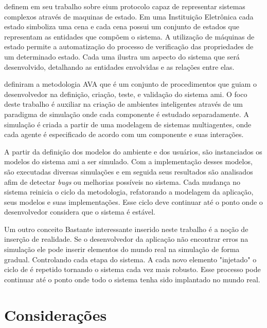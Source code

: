 
 definem  em seu trabalho sobre \acrfull{ei}um protocolo capaz de representar sistemas complexos através de maquinas de estado. Em uma Instituição Eletrônica cada estado simboliza uma cena e cada cena possui um conjunto de estados que representam as entidades que compõem o sistema. A utilização de máquinas de estado permite a automatização do processo de verificação das propriedades de um determinado estado. Cada uma ilustra um aspecto do sistema que será desenvolvido, detalhando as entidades envolvidas e as relações entre elas. 


 definiram a metodologia AVA que é um conjunto de procedimentos que guiam o desenvolvedor na definição, criação, teste, e validação do sistema \acrshort{ami}.  O foco deste trabalho é auxiliar na criação de ambientes inteligentes através de um paradigma de simulação onde cada componente é estudado separadamente. A simulação é criada a partir de uma modelagem de sistemas multiagentes, onde cada agente é especificado de acordo com um componente e suas interações.

A partir da definição dos modelos do ambiente e dos usuários, são instanciados os modelos do sistema \acrshort{ami} a ser simulado. Com a implementação desses modelos, são executadas diversas simulações e em seguida seus resultados são analisados afim de detectar \textit{bugs} ou melhorias possíveis no sistema. Cada mudança no sistema reinicia o ciclo da metodologia, refatorando a modelagem da aplicação, seus modelos e suas implementações. Esse ciclo deve continuar até o ponto onde o desenvolvedor considera que o sistema é estável. 

Um outro conceito Bastante interessante inserido neste trabalho é a noção de inserção de realidade. Se o desenvolvedor da aplicação não encontrar erros na simulação ele pode inserir elementos do mundo real na simulação de forma gradual. Controlando cada etapa do sistema. A cada novo elemento "injetado" o ciclo de é repetido tornando o sistema cada vez mais robusto. Esse processo pode continuar até o ponto onde todo o sistema tenha sido implantado no mundo real. 

\section{Considerações}

